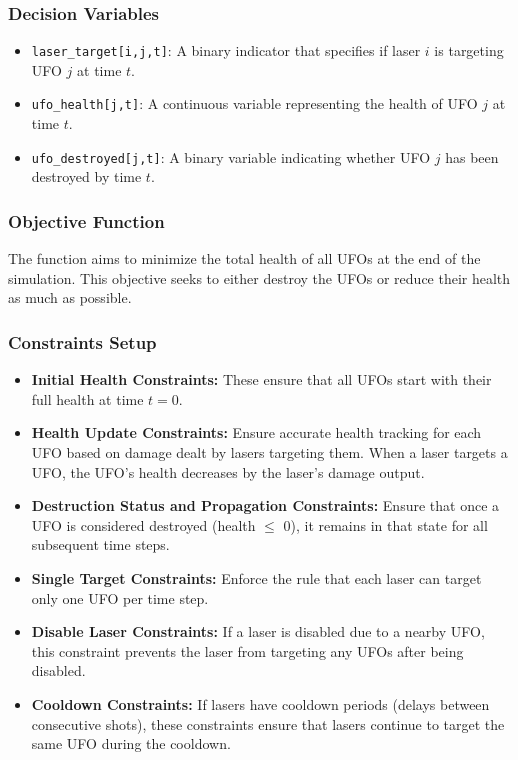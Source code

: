 \documentclass[12pt]{article}
\begin{document}
\subsubsection{Decision Variables}
\begin{itemize}
    \item \texttt{laser\_target[i,j,t]}: A binary indicator that specifies if laser $i$ is targeting UFO $j$ at time $t$.
    \item \texttt{ufo\_health[j,t]}: A continuous variable representing the health of UFO $j$ at time $t$.
    \item \texttt{ufo\_destroyed[j,t]}: A binary variable indicating whether UFO $j$ has been destroyed by time $t$.
\end{itemize}

\subsubsection{Objective Function}
The function aims to minimize the total health of all UFOs at the end of the simulation. This objective seeks to either destroy the UFOs or reduce their health as much as possible.

\subsubsection{Constraints Setup}
\begin{itemize}
    \item \textbf{Initial Health Constraints:} These ensure that all UFOs start with their full health at time $t = 0$.
    \item \textbf{Health Update Constraints:} Ensure accurate health tracking for each UFO based on damage dealt by lasers targeting them. When a laser targets a UFO, the UFO’s health decreases by the laser’s damage output.
    \item \textbf{Destruction Status and Propagation Constraints:} Ensure that once a UFO is considered destroyed (health $\leq$ 0), it remains in that state for all subsequent time steps.
    \item \textbf{Single Target Constraints:} Enforce the rule that each laser can target only one UFO per time step.
    \item \textbf{Disable Laser Constraints:} If a laser is disabled due to a nearby UFO, this constraint prevents the laser from targeting any UFOs after being disabled.
    \item \textbf{Cooldown Constraints:} If lasers have cooldown periods (delays between consecutive shots), these constraints ensure that lasers continue to target the same UFO during the cooldown.
\end{itemize}
\end{document}

